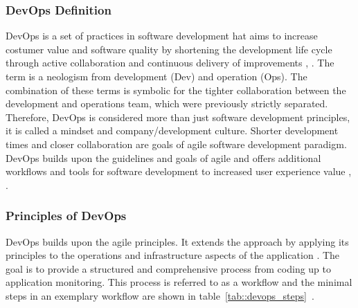 \documentclass[12pt, a4paper]{article}
\begin{document}
        \subsubsection{DevOps Definition}
        DevOps is a set of practices in software development hat aims to increase costumer value and software quality by shortening the development life cycle through active collaboration and continuous delivery of improvements \cite{base_devops}, \cite{effective_devops}. The term  is a neologism from development (Dev) and operation (Ops). The combination of these terms is symbolic for the tighter collaboration between the development and operations team, which were previously strictly separated. Therefore, DevOps is considered more than just software development principles, it is called a mindset and company/development culture. Shorter development times and closer collaboration are goals of agile software development paradigm. DevOps builds upon the guidelines and goals of agile and offers additional workflows and tools for software development to increased user experience value \cite{azuredevops}, \cite{effective_devops}.

        \subsubsection{Principles of DevOps}\label{ssec::devops_princibles}
        DevOps builds upon the agile principles. It extends the  approach by applying its principles to the operations and infrastructure aspects of the application \cite{effective_devops}. The goal is to provide a structured and comprehensive process from coding up to application monitoring. This process is referred to as a workflow and the minimal steps in an exemplary workflow are shown in table~\ref{tab::devops_steps}~\cite{base_devops}.\newline
\end{document}
